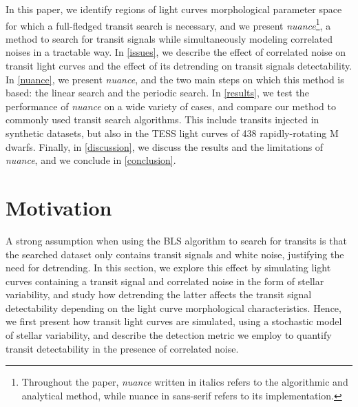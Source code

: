 \documentclass[modern]{aastex631}
\newcommand{\nuancemethod}{\textit{nuance}}
\newcommand{\nuance}{\nuancemethod{}}
\newcommand{\nuancecode}{\textsf{nuance}}
\begin{document}
In this paper, we identify regions of light curves morphological parameter space for which a full-fledged transit search is necessary, and we present \nuancemethod{}\footnote{Throughout the paper, \nuancemethod{} written in italics refers to the algorithmic and analytical method, while \nuancecode{} in sans-serif refers to its implementation.}, a method to search for transit signals while simultaneously modeling correlated noises in a tractable way. In \autoref{issues}, we describe the effect of correlated noise on transit light curves and the effect of its detrending on transit signals detectability. In \autoref{nuance}, we present \nuance{}, and the two main steps on which this method is based: the linear search and the periodic search. In \autoref{results}, we test the performance of \nuance{} on a wide variety of cases, and compare our method to commonly used transit search algorithms. This include transits injected in synthetic datasets, but also in the TESS light curves of 438 rapidly-rotating M dwarfs. Finally, in \autoref{discussion}, we discuss the results and the limitations of \nuance{}, and we conclude in \autoref{conclusion}.

\newpage
\section{Motivation}\label{issues}

A strong assumption when using the BLS algorithm to search for transits is that the searched dataset only contains transit signals and white noise, justifying the need for detrending. In this section, we explore this effect by simulating light curves containing a transit signal and correlated noise in the form of stellar variability, and study how detrending the latter affects the transit signal detectability depending on the light curve morphological characteristics. Hence, we first present how transit light curves are simulated, using a stochastic model of stellar variability, and describe the detection metric we employ to quantify transit detectability in the presence of correlated noise.
\end{document}
